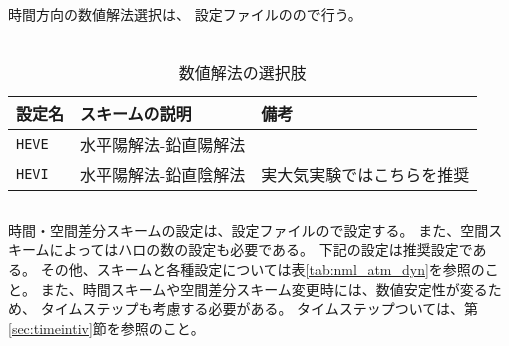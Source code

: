 \section{\SecBasicDynamicsSetting} \label{sec:atmos_dyn}


\subsection{\SubsecDynsolverSetting}  \label{subsec:atmos_dyn_sover}
時間方向の数値解法選択は、
設定ファイルのので行う。\\

\\

\begin{table}[h]
\begin{center}
  \caption{数値解法の選択肢}
  \label{tab:nml_dyn}
  \begin{tabularx}{150mm}{llX} \hline
    \rowcolor[gray]{0.9}  設定名 & スキームの説明 & 備考\\ \hline
      \verb|HEVE|  & 水平陽解法-鉛直陽解法 & \\
      \verb|HEVI|  & 水平陽解法-鉛直陰解法 & 実大気実験ではこちらを推奨\\
    \hline
  \end{tabularx}
\end{center}
\end{table}


\subsection{\SubsecDynSchemeSetting} \label{subsec:atmos_dyn_scheme}
時間・空間差分スキームの設定は、設定ファイルので設定する。
また、空間スキームによってはハロの数の設定も必要である。
下記の設定は推奨設定である。
その他、スキームと各種設定については表\ref{tab:nml_atm_dyn}を参照のこと。
また、時間スキームや空間差分スキーム変更時には、数値安定性が変るため、
タイムステップも考慮する必要がある。
タイムステップついては、第\ref{sec:timeintiv}節を参照のこと。\\

